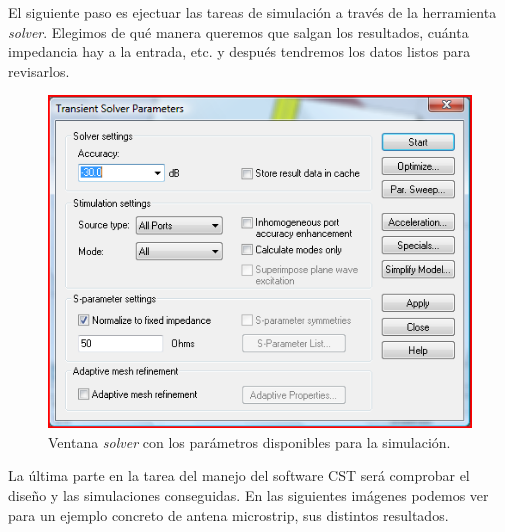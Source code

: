 El siguiente paso es ejectuar las tareas de simulación a través de la herramienta \textit{solver}. Elegimos de qué manera queremos que salgan los resultados, cuánta impedancia hay a la entrada, etc. y después tendremos los datos listos para revisarlos.

\begin{figure}[!htb]
    \centering
    \includegraphics[scale=0.45]{./Metodologia/CST_solver}
    \caption{Ventana \textit{solver} con los parámetros disponibles para la simulación.}
    \label{fig:fig4.7}
\end{figure}

La última parte en la tarea del manejo del software CST será comprobar el diseño y las simulaciones conseguidas. En las siguientes imágenes podemos ver para un ejemplo concreto de antena microstrip, sus distintos resultados.

\clearpage

